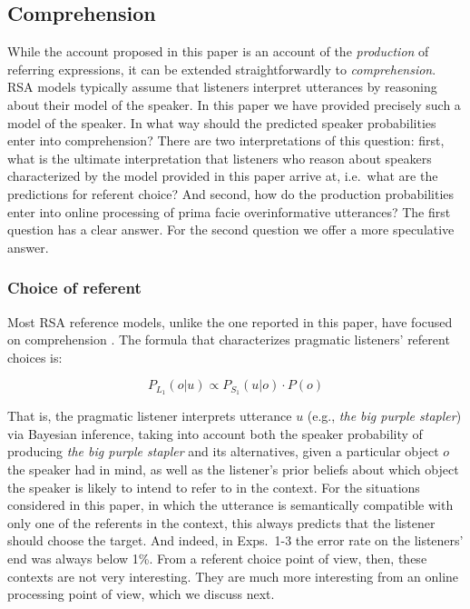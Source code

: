 \documentclass[11pt]{article}
\begin{document}
\subsection{Comprehension}


While the account proposed in this paper is an account of the \emph{production} of referring expressions, it can be extended straightforwardly to \emph{comprehension}. RSA models typically assume that listeners  interpret utterances by reasoning about their model of the speaker. In this paper we have provided precisely such a model of the speaker. In what way should the predicted speaker probabilities enter into comprehension? There are two interpretations of this question: first, what is the ultimate interpretation that listeners who reason about speakers characterized by the model provided in this paper arrive at, i.e.~what are the predictions for referent choice? And second, how do the production probabilities enter into online processing of prima facie overinformative utterances? The first question has a clear answer. For the second question we offer a more speculative answer.

\subsubsection{Choice of referent}

Most RSA reference models, unlike the one reported in this paper, have focused on comprehension \cite{frank2012, degenfrankejaeger2013, QingFranke2015, FrankeDegen2016}. The formula that characterizes pragmatic listeners' referent choices is:

\begin{equation}
P_{L_1}(o | u) \propto P_{S_1}(u | o) \cdot P(o)
\end{equation}

That is, the pragmatic listener interprets utterance $u$ (e.g., \emph{the big purple stapler}) via Bayesian inference, taking into account both the speaker probability of producing \emph{the big purple stapler} and its alternatives, given a particular object $o$ the speaker had in mind, as well as the listener's prior beliefs about which object the speaker is likely to intend to refer to in the context. For the situations considered in this paper, in which the utterance is  semantically compatible with only one of the referents in the context, this always predicts that the listener should choose the target. And indeed, in Exps.~1-3 the error rate on the listeners' end was always below 1\%. From a referent choice point of view, then, these contexts are not very interesting. They are much more interesting from an online processing point of view, which we discuss next.
\end{document}
